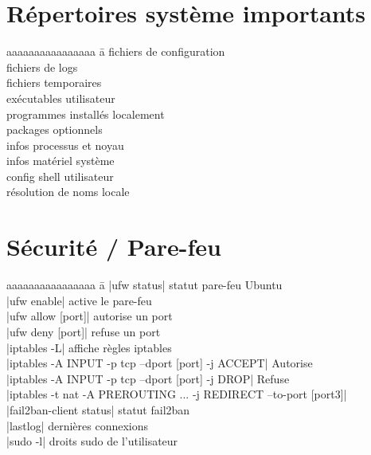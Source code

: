 \documentclass{article}
\begin{document}
\begin{multicols}{4}
    \section*{Répertoires système importants}
    \begin{tabbing}
        aaaaaaaaaaaaaaaa \= a \kill
         \> fichiers de configuration \\
         \> fichiers de logs \\
         \> fichiers temporaires \\
         \> exécutables utilisateur \\
         \> programmes installés localement \\
         \> packages optionnels \\
         \> infos processus et noyau \\
         \> infos matériel système \\
         \> config shell utilisateur \\
         \> résolution de noms locale
    \end{tabbing}

    \section*{Sécurité / Pare-feu}
    \begin{tabbing}
        aaaaaaaaaaaaaaaa \= a \kill
        \code|ufw status| \> statut pare-feu Ubuntu \\
        \code|ufw enable| \> active le pare-feu \\
        \code|ufw allow [port]| \> autorise un port \\
        \code|ufw deny [port]| \> refuse un port \\
        \code|iptables -L| \> affiche règles iptables \\
        \code|iptables -A INPUT -p tcp --dport [port] -j ACCEPT| Autorise \\
        \code|iptables -A INPUT -p tcp --dport [port] -j DROP| Refuse \\
        \code|iptables -t nat -A PREROUTING ... -j REDIRECT --to-port [port3]| \\

        \code|fail2ban-client status| \> statut fail2ban \\
        \code|lastlog| \> dernières connexions \\
        \code|sudo -l| \> droits sudo de l'utilisateur
    \end{tabbing}



\end{multicols}
\end{document}
